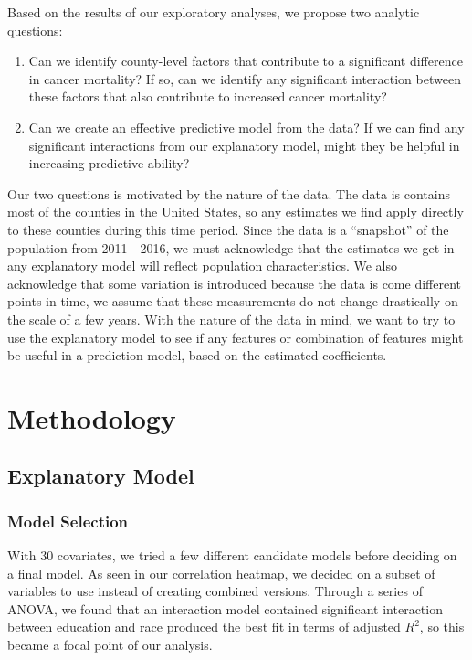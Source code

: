 \documentclass[
  11pt,
]{article}
\providecommand{\tightlist}{%
  \setlength{\itemsep}{0pt}\setlength{\parskip}{0pt}}
\begin{document}
Based on the results of our exploratory analyses, we propose two
analytic questions:

\begin{enumerate}
\def\labelenumi{\arabic{enumi}.}
\tightlist
\item
  Can we identify county-level factors that contribute to a significant
  difference in cancer mortality? If so, can we identify any significant
  interaction between these factors that also contribute to increased
  cancer mortality?
\item
  Can we create an effective predictive model from the data? If we can
  find any significant interactions from our explanatory model, might
  they be helpful in increasing predictive ability?
\end{enumerate}

Our two questions is motivated by the nature of the data. The data is
contains most of the counties in the United States, so any estimates we
find apply directly to these counties during this time period. Since the
data is a ``snapshot'' of the population from 2011 - 2016, we must
acknowledge that the estimates we get in any explanatory model will
reflect population characteristics. We also acknowledge that some
variation is introduced because the data is come different points in
time, we assume that these measurements do not change drastically on the
scale of a few years. With the nature of the data in mind, we want to
try to use the explanatory model to see if any features or combination
of features might be useful in a prediction model, based on the
estimated coefficients.

\hypertarget{methodology}{%
\section{Methodology}\label{methodology}}

\hypertarget{explanatory-model}{%
\subsection{Explanatory Model}\label{explanatory-model}}

\hypertarget{model-selection}{%
\subsubsection{Model Selection}\label{model-selection}}

With 30 covariates, we tried a few different candidate models before
deciding on a final model. As seen in our correlation heatmap, we
decided on a subset of variables to use instead of creating combined
versions. Through a series of ANOVA, we found that an interaction model
contained significant interaction between education and race produced
the best fit in terms of adjusted \(R^2\), so this became a focal point
of our analysis.
\end{document}
